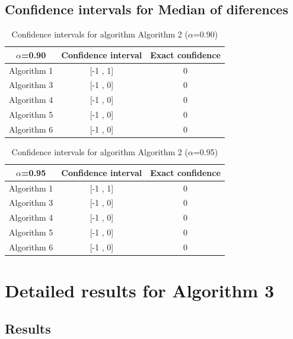 \documentclass[a4paper,10pt]{article}
\begin{document}
\subsection{Confidence intervals for Median of diferences}

\begin{table}[!htp]
\centering\small
\begin{tabular}{
|c|c|c|}
\hline
 $\alpha$=0.90 & Confidence interval & Exact confidence \\ \hline 
Algorithm 1 & [-1 , 1] & 0\\ \hline 
Algorithm 3 & [-1 , 0] & 0\\ \hline 
Algorithm 4 & [-1 , 0] & 0\\ \hline 
Algorithm 5 & [-1 , 0] & 0\\ \hline 
Algorithm 6 & [-1 , 0] & 0\\ \hline 

\end{tabular}
\caption{Confidence intervals for algorithm Algorithm 2 ($\alpha$=0.90)}
\end{table}
\begin{table}[!htp]
\centering\small
\begin{tabular}{
|c|c|c|}
\hline
 $\alpha$=0.95 & Confidence interval & Exact confidence \\ \hline 
Algorithm 1 & [-1 , 1] & 0\\ \hline 
Algorithm 3 & [-1 , 0] & 0\\ \hline 
Algorithm 4 & [-1 , 0] & 0\\ \hline 
Algorithm 5 & [-1 , 0] & 0\\ \hline 
Algorithm 6 & [-1 , 0] & 0\\ \hline 

\end{tabular}
\caption{Confidence intervals for algorithm Algorithm 2 ($\alpha$=0.95)}
\end{table}

 \clearpage 


\section{Detailed results for Algorithm 3}


\subsection{Results}
\end{document}

